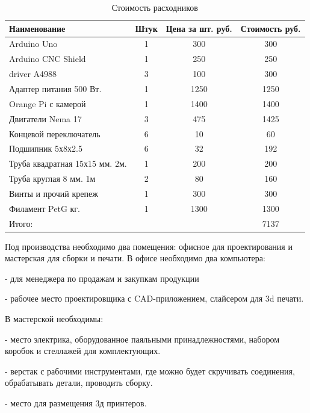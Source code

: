 \begin{table}[h!]
    \centering
\begin{tabular}{|l|c|c|c| }
\hline
Наименование & Штук & Цена за шт. руб.  & Стоимость руб. \\
\hline
Arduino Uno & 1 & 300 & 300 \\
\hline
Arduino CNC Shield & 1  & 250 & 250 \\
\hline
driver A4988 & 3  & 100 & 300 \\
\hline
Адаптер питания 500 Вт. & 1 & 1250 & 1250 \\
\hline
Orange Pi  с камерой & 1 & 1400 & 1400\\
\hline
Двигатели Nema 17 & 3  & 475  & 1425  \\
\hline
Концевой переключатель & 6 & 10  & 60  \\
\hline
Подшипник 5х8х2.5 & 6  & 32  &  192 \\
\hline
Труба квадратная 15х15 мм. 2м. & 1  & 200  & 200  \\
\hline
Труба круглая 8 мм. 1м & 2 & 80 & 160 \\
\hline
Винты и прочий крепеж & 1 & 300 & 300 \\
\hline
Филамент PetG кг.  &  1  & 1300 & 1300 \\
\hline
Итого: &  &  & 7137 \\
\hline
\end{tabular}
\caption{Стоимость расходников}
\end{table}

Под производства необходимо два помещения: офисное для проектирования и мастерская для сборки и печати. В офисе необходимо два компьютера:

- для менеджера по продажам и закупкам продукции

- рабочее место проектировщика с CAD-приложением, слайсером для 3d печати.

В мастерской необходимы:

- место электрика, оборудованное паяльными принадлежностями, набором коробок и стеллажей для комплектующих.

- верстак с рабочими инструментами, где можно будет скручивать соединения, обрабатывать детали, проводить сборку.

- место для размещения 3д принтеров.

